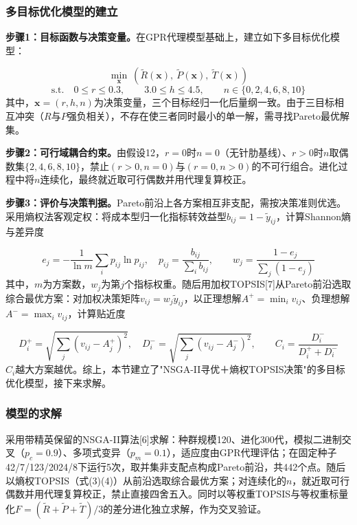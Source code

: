 \documentclass[withoutpreface]{cumcmthesis}
\begin{document}
\subsubsection{多目标优化模型的建立}
\textbf{步骤1：目标函数与决策变量。}在GPR代理模型基础上，建立如下多目标优化模型：

\begin{equation}
\min_{\mathbf{x}}\ \left(\tilde R(\mathbf{x}),\ \tilde P(\mathbf{x}),\ \tilde T(\mathbf{x})\right) \tag{1}
\end{equation}
\begin{equation}
\text{s.t.}\quad 0\leq r\leq 0.3,\qquad 3.0\leq h\leq 4.5,\qquad n\in\{0,2,4,6,8,10\} \tag{2}
\end{equation}
其中，$\mathbf{x}=(r,h,n)$为决策变量，三个目标经归一化后量纲一致。由于三目标相互冲突（$R$与$P$强负相关），不存在使三者同时最小的单一解，需寻找Pareto最优解集。

\textbf{步骤2：可行域耦合约束。}由假设12，$r=0$时$n=0$（无针肋基线）、$r>0$时$n$取偶数集$\{2,4,6,8,10\}$，禁止$(r>0,n=0)$与$(r=0,n>0)$的不可行组合。进化过程中将$n$连续化，最终就近取可行偶数并用代理复算校正。

\textbf{步骤3：评价与决策判据。}Pareto前沿上各方案相互非支配，需按决策准则优选。采用熵权法客观定权：将成本型归一化指标转效益型$b_{ij}=1-\tilde y_{ij}$，计算Shannon熵与差异度

\begin{equation}
e_j=-\frac{1}{\ln m}\sum_{i}p_{ij}\ln p_{ij},\quad p_{ij}=\frac{b_{ij}}{\sum_i b_{ij}},\qquad w_j=\frac{1-e_j}{\sum_j(1-e_j)} \tag{3}
\end{equation}
其中，$m$为方案数，$w_j$为第$j$个指标权重。随后用加权TOPSIS[7]从Pareto前沿选取综合最优方案：对加权决策矩阵$v_{ij}=w_j\tilde y_{ij}$，以正理想解$A^+=\min_i v_{ij}$、负理想解$A^-=\max_i v_{ij}$，计算贴近度

\begin{equation}
D_i^+=\sqrt{\sum_j(v_{ij}-A_j^+)^2},\quad D_i^-=\sqrt{\sum_j(v_{ij}-A_j^-)^2},\qquad C_i=\frac{D_i^-}{D_i^+ + D_i^-} \tag{4}
\end{equation}
$C_i$越大方案越优。综上，本节建立了"NSGA-II寻优＋熵权TOPSIS决策"的多目标优化模型，接下来求解。

\subsubsection{模型的求解}
采用带精英保留的NSGA-II算法[6]求解：种群规模120、进化300代，模拟二进制交叉（$p_c=0.9$）、多项式变异（$p_m=0.1$），适应度由GPR代理评估；在固定种子42/7/123/2024/8下运行5次，取并集非支配点构成Pareto前沿，共442个点。随后以熵权TOPSIS（式(3)(4)）从前沿选取综合最优方案；对连续化的$n$，就近取可行偶数并用代理复算校正，禁止直接四舍五入。同时以等权重TOPSIS与等权重标量化$F=(\tilde R+\tilde P+\tilde T)/3$的差分进化独立求解，作为交叉验证。
\end{document}
